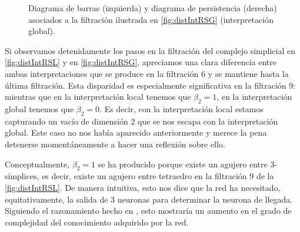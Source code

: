 \documentclass[12pt, a4paper, twoside]{book}
\numberwithin{equation}{section}
\theoremstyle{definition}
\newenvironment{ejem}
  {\pushQED{\qed}\renewcommand{\qedsymbol}{$\blacktriangleleft$}\ejemplo}
  {\popQED\endejemplo}
\theoremstyle{remark}
\theoremstyle{plain}
\begin{document}
\begin{ejem}
\begin{figure}[!htbp]
\begin{figure}[H]
			\end{figure}
		\endminipage
		\caption{Diagrama de barras (izquierda) y diagrama de 
		persistencia (derecha) asociados a la filtración ilustrada en 
		\ref{fig:distIntRSG} (interpretación global).}
		\label{fig:distIntRDG}
	\end{figure}

	Si observamos detenidamente los pasos en la filtración del complejo 
	simplicial en \autoref{fig:distIntRSL} y en \autoref{fig:distIntRSG}, 
	apreciamos una clara diferencia entre ambas interpretaciones que se 
	produce en la filtración 6 y se mantiene hasta la última filtración. 
	Esta disparidad es especialmente significativa en la filtración 9: 
	mientras que en la interpretación local tenemos que $\beta_{2}=1$, en 
	la interpretación global tenemos que $\beta_{2}=0$. Es decir, con la 
	interpretación local estamos capturando un vacío de dimensión 2 que
	se nos escapa con la interpretación global. Este caso no nos había 
	aparecido anteriormente y merece la pena detenerse momentáneamente a 
	hacer una reflexión sobre ello.

	Conceptualmente, $\beta_{2}=1$ se ha producido porque existe un agujero
	entre $3$-símplices, es decir, existe un agujero entre tetraedro en 
	la filtración 9 de la \autoref{fig:distIntRSL}. De manera intuitiva, 
	esto nos dice que la red ha necesitado, equitativamente, la 
	salida de 3 neuronas para determinar la neurona de llegada. Siguiendo 
	el razonamiento hecho en \cite{Articulo-Watanabe}, esto mostraría un 
	aumento en el grado de complejidad del conocimiento adquirido por la 
	red.


\end{ejem}
\end{document}
